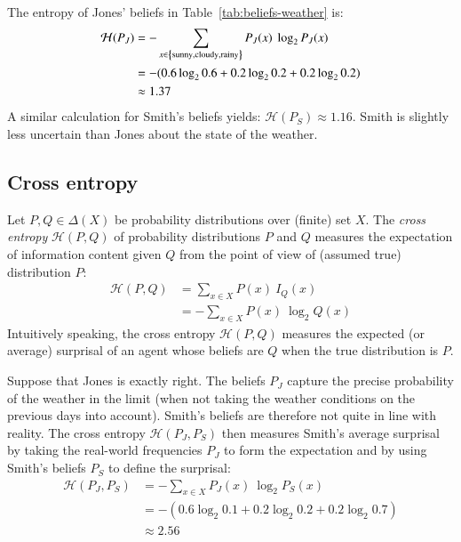 \documentclass[nobib,nofonts]{tufte-handout}
\begin{document}
\begin{example}
  The entropy of Jones' beliefs in Table~\ref{tab:beliefs-weather} is:
  \begin{align*}
    \mathcal{H}(P_{J})
 & = - \sum_{x \in \left\{\text{sunny}, \text{cloudy}, \text{rainy}\right\}} P_{J}(x) \ \log_{2} P_{J}(x) \\
 & = - (0.6  \log_{2} 0.6
   +  0.2  \log_{2} 0.2
   +  0.2  \log_{2} 0.2) \\
 & \approx 1.37
  \end{align*}
  A similar calculation for Smith's beliefs yields: $\mathcal{H}(P_{S}) \approx 1.16$.
  Smith is slightly less uncertain than Jones about the state of the weather.
\end{example}

\subsection{Cross entropy}

Let $P, Q \in \Delta(X)$ be probability distributions over (finite) set $X$.
The \emph{cross entropy} $\mathcal{H}(P,Q)$ of probability distributions $P$ and $Q$ measures the expectation of information content given $Q$ from the point of view of (assumed true) distribution $P$:
\begin{align*}
  \mathcal{H}(P,Q) & = \sum_{x \in X} P(x) \ I_{Q}(x) \\
                   & = - \sum_{x \in X} P(x) \ \log_{2} Q(x)
\end{align*}
Intuitively speaking, the cross entropy $\mathcal{H}(P,Q)$ measures the expected (or average) surprisal of an agent whose beliefs are $Q$ when the true distribution is $P$.

\begin{example}
  Suppose that Jones is exactly right.
  The beliefs $P_{J}$ capture the precise probability of the weather in the limit (when not taking the weather conditions on the previous days into account).
  Smith's beliefs are therefore not quite in line with reality.
  The cross entropy $\mathcal{H}(P_{J}, P_{S})$ then measures Smith's average surprisal by taking the real-world frequencies $P_{J}$ to form the expectation and by using Smith's beliefs $P_{S}$ to define the surprisal:
  \begin{align*}
    \mathcal{H}(P_{J}, P_{S}) & = - \sum_{x \in X} P_{J}(x) \ \log_{2} P_{S}(x) \\
    & = -( 0.6 \log_{2} 0.1  +
    0.2 \log_{2} 0.2  +
      0.2 \log_{2} 0.7  ) \\
    & \approx 2.56
  \end{align*}
\end{example}
\end{document}
